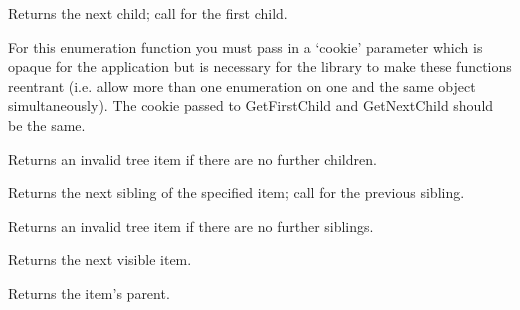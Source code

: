 Returns the next child; call  for the first child.

For this enumeration function you must pass in a `cookie' parameter
which is opaque for the application but is necessary for the library
to make these functions reentrant (i.e. allow more than one
enumeration on one and the same object simultaneously). The cookie passed to
GetFirstChild and GetNextChild should be the same.

Returns an invalid tree item if there are no further children.






\label{wxtreectrlgetnextsibling}


Returns the next sibling of the specified item; call  for the previous sibling.

Returns an invalid tree item if there are no further siblings.




\label{wxtreectrlgetnextvisible}


Returns the next visible item.


\label{wxtreectrlgetitemparent}


Returns the item's parent.


\label{wxtreectrlgetparent}


